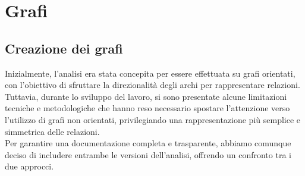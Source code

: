 \documentclass[12pt]{article}
\begin{document}
	\section{Grafi}
	\subsection{Creazione dei grafi}
	Inizialmente, l'analisi era stata concepita per essere effettuata su grafi orientati, con l'obiettivo di sfruttare la direzionalità degli archi per rappresentare relazioni.\\
	Tuttavia, durante lo sviluppo del lavoro, si sono presentate alcune limitazioni tecniche e metodologiche che hanno reso necessario spostare l'attenzione verso l'utilizzo di grafi non orientati, privilegiando una rappresentazione più semplice e simmetrica delle relazioni.\\ 
	Per garantire una documentazione completa e trasparente, abbiamo comunque deciso di includere entrambe le versioni dell'analisi, offrendo un confronto tra i due approcci.
	
\end{document}
